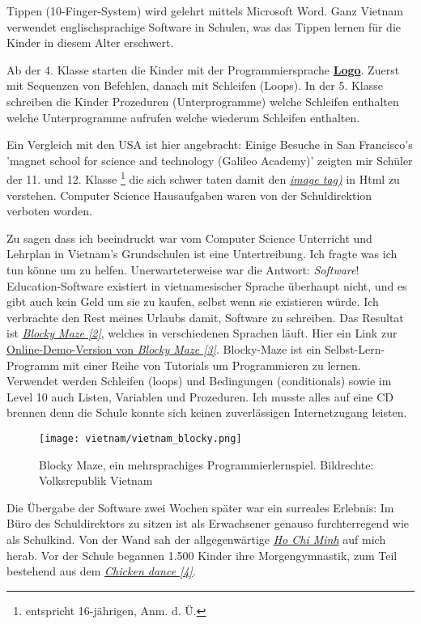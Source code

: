 Tippen (10-Finger-System) wird gelehrt mittels Microsoft Word. Ganz Vietnam verwendet englischsprachige Software in Schulen, was das Tippen lernen für die Kinder in diesem Alter erschwert.

Ab der 4. Klasse starten die Kinder mit der Programmiersprache \href{http://de.wikipedia.org/wiki/Logo_(Programmiersprache)}{\textbf{Logo}}. Zuerst mit Sequenzen von Befehlen, danach mit Schleifen (Loops). In der 5. Klasse schreiben die Kinder Prozeduren (Unterprogramme) welche Schleifen enthalten welche Unterprogramme aufrufen welche wiederum Schleifen enthalten.

Ein Vergleich mit den USA ist hier angebracht: Einige Besuche in San Francisco's 'magnet school for science and technology (Galileo Academy)' zeigten mir Schüler der 11. und 12. Klasse \footnote{entspricht 16-jährigen, Anm. d. Ü.} die sich schwer taten damit den \href{http://de.selfhtml.org/html/grafiken/einbinden.htm#referenz}{\textit{image tag)}} in Html zu verstehen. Computer Science Hausaufgaben waren von der Schuldirektion verboten worden.

Zu sagen dass ich beeindruckt war vom Computer Science Unterricht und Lehrplan in Vietnam's Grundschulen ist eine Untertreibung. Ich fragte was ich tun könne um zu helfen. Unerwarteterweise war die Antwort: \textit{Software}! Education-Software existiert in vietnamesischer Sprache überhaupt nicht, und es gibt auch kein Geld um sie zu kaufen, selbst wenn sie existieren würde.  Ich verbrachte den Rest meines Urlaubs damit, Software zu schreiben. Das Resultat ist \href{https://code.google.com/p/blockly/}{\textit{Blocky Maze [2]}}, welches in verschiedenen Sprachen läuft. Hier ein Link zur \href{http://blockly-demo.appspot.com/static/apps/maze/en.html?level=1}{Online-Demo-Version von \textit{Blocky Maze [3]}}. Blocky-Maze ist ein Selbst-Lern-Programm mit einer Reihe von Tutorials um Programmieren zu lernen. Verwendet werden Schleifen (loops) und Bedingungen (conditionals) sowie im Level 10 auch Listen, Variablen und Prozeduren. Ich musste alles auf eine CD brennen denn die Schule konnte sich keinen zuverlässigen Internetzugang leisten.

\begin{figure}
\texttt{[image: vietnam/vietnam\_blocky.png]}
\caption{Blocky Maze, ein mehrsprachiges Programmierlernspiel. Bildrechte: Volksrepublik Vietnam}
\end{figure}

Die Übergabe der Software zwei Wochen später war ein surreales Erlebnis: Im Büro des Schuldirektors zu sitzen ist als Erwachsener genauso furchterregend wie als Schulkind. Von der Wand sah der allgegenwärtige \href{http://goo.gl/fZATT3}{\textit{Ho Chi Minh}} auf mich herab. Vor der Schule begannen 1.500 Kinder ihre Morgengymnastik, zum Teil bestehend aus dem \href{http://www.youtube.com/watch?v=4xmV5uHWNag}{\textit{Chicken dance [4]}}.

